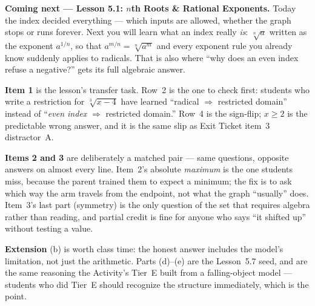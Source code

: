 \documentclass[10pt]{article}
\begin{document}
\begin{spiralbox}
\textbf{Coming next --- Lesson 5.1: $n$th Roots \& Rational Exponents.} Today the index decided
everything --- which inputs are allowed, whether the graph stops or runs forever. Next you will learn
what an index really \emph{is}: $\sqrt[n]{a}$ written as the exponent $a^{1/n}$, so that
$a^{m/n}=\sqrt[n]{a^m}$ and every exponent rule you already know suddenly applies to radicals. That
is also where ``why does an even index refuse a negative?'' gets its full algebraic answer.
\end{spiralbox}

\begin{teachernote}
\textbf{Item 1} is the lesson's transfer task. Row~2 is the one to check first: students who write a
restriction for $\sqrt[3]{x-4}$ have learned ``radical $\Rightarrow$ restricted domain'' instead of
``\emph{even index} $\Rightarrow$ restricted domain.'' Row~4 is the sign-flip; $x\ge 2$ is the
predictable wrong answer, and it is the same slip as Exit Ticket item~3 distractor~A.

\textbf{Items 2 and 3} are deliberately a matched pair --- same questions, opposite answers on almost
every line. Item~2's absolute \emph{maximum} is the one students miss, because the parent trained them
to expect a minimum; the fix is to ask which way the arm travels from the endpoint, not what the graph
``usually'' does. Item~3's last part (symmetry) is the only question of the set that requires
algebra rather than reading, and partial credit is fine for anyone who says ``it shifted up'' without
testing a value.

\textbf{Extension} (b) is worth class time: the honest answer includes the model's limitation, not
just the arithmetic. Parts (d)--(e) are the Lesson~5.7 seed, and are the same reasoning the Activity's
Tier~E built from a falling-object model --- students who did Tier~E should recognize the structure
immediately, which is the point.
\end{teachernote}
\end{document}
